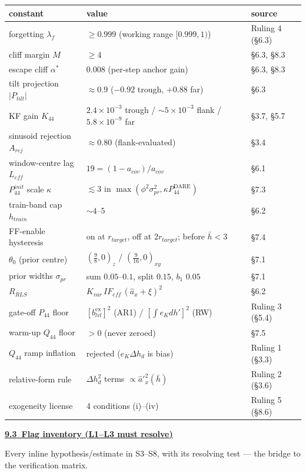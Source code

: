 \documentclass[11pt,a4paper,fontset=none]{ctexart}
\newcommand{\hd}[1]{\par\medskip\noindent\underline{\textbf{#1}}\par\nobreak\vspace{0.2ex}}
\begin{document}
{\footnotesize\setlength{\tabcolsep}{6pt}
\begin{tabular}{@{}p{4.7cm} p{6.6cm} p{2.9cm}@{}}
\toprule
constant & value & source \\
\midrule
forgetting $\lambda_f$ & $\ge 0.999$ (working range $[0.999,1)$) & Ruling 4 (\S6.3) \\
cliff margin $M$ & $\ge 4$ & \S6.3, \S8.3 \\
escape cliff $\alpha^\ast$ & $0.008$ (per-step anchor gain) & \S6.3, \S8.3 \\
tilt projection $|P_{tilt}|$ & $\approx 0.9$ ($-0.92$ trough, $+0.88$ far) & \S6.3 \\
KF gain $K_{44}$ & $2.4{\times}10^{-3}$ trough / $\sim\!5{\times}10^{-3}$ flank / $5.8{\times}10^{-9}$ far & \S3.7, \S5.7 \\
sinusoid rejection $A_{rej}$ & $\approx 0.80$ (flank-evaluated) & \S3.4 \\
window-centre lag $L_{eff}$ & $19=(1{-}a_{cov})/a_{cov}$ & \S6.1 \\
$P_{44}^{init}$ scale $\kappa$ & $\lesssim 3$ in $\max(\phi^2\sigma_{pr}^2,\kappa P_{44}^{\mathrm{DARE}})$ & \S7.3 \\
train-band cap $h_{train}$ & $\sim 4$--$5$ & \S6.2 \\
FF-enable hysteresis & on at $r_{target}$, off at $2r_{target}$; before $\bar h\!<\!3$ & \S7.4 \\
$\theta_0$ (prior centre) & $(\tfrac98,0)_z$ / $(\tfrac9{16},0)_{xy}$ & \S7.1 \\
prior widths $\sigma_{pr}$ & sum $0.05$--$0.1$, split $0.15$, $b_1$ $0.05$ & \S7.1 \\
$R_{RLS}$ & $K_{var}\,IF_{eff}\,(\hat a_x+\xi)^2$ & \S6.2 \\
gate-off $P_{44}$ floor & $[b_{lvl}^{\mathrm{ex}}]^2$ (AR1) / $[\!\int\! e_K dh']^2$ (RW) & Ruling 3 (\S5.4) \\
warm-up $Q_{44}$ floor & $>0$ (never zeroed) & \S7.5 \\
$Q_{44}$ ramp inflation & rejected ($e_K\Delta h_d$ is bias) & Ruling 1 (\S3.3) \\
relative-form rule & $\Delta h_d^2$ terms $\propto\hat a'^2_x(\bar h)$ & Ruling 2 (\S3.6) \\
exogeneity license & 4 conditions (i)--(iv) & Ruling 5 (\S8.6) \\
\bottomrule
\end{tabular}}

\hd{9.3\ Flag inventory (L1--L3 must resolve)}
Every inline hypothesis/estimate in S3--S8, with its resolving test --- the bridge to the verification matrix.
\medskip
\end{document}
